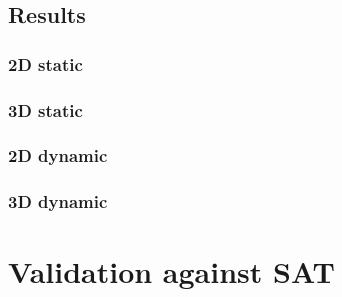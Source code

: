 \documentclass[12pt, a4paper]{article}
\begin{document}
\subsection{Results}

\subsubsection{2D static}

\begin{scriptsize}
\begin{ttfamily}

\end{ttfamily}
\end{scriptsize}

\subsubsection{3D static}

\begin{scriptsize}
\begin{ttfamily}

\end{ttfamily}
\end{scriptsize}

\subsubsection{2D dynamic}

\begin{scriptsize}
\begin{ttfamily}

\end{ttfamily}
\end{scriptsize}

\subsubsection{3D dynamic}

\begin{scriptsize}
\begin{ttfamily}

\end{ttfamily}
\end{scriptsize}

\section{Validation against SAT}
\end{document}
